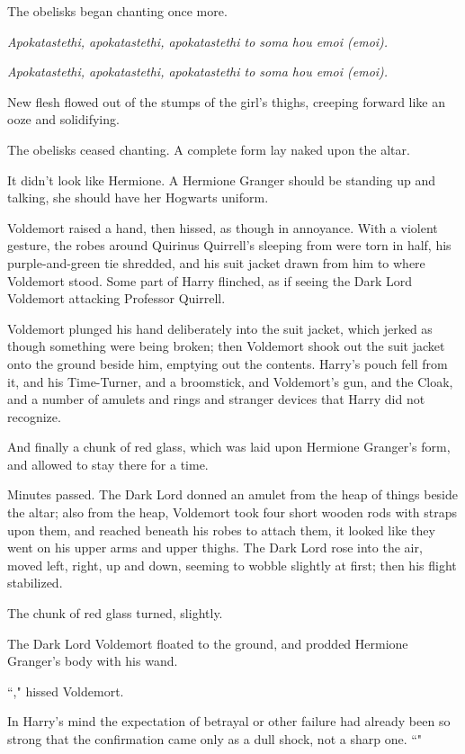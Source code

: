 The obelisks began chanting once more.

\emph{Apokatastethi, apokatastethi, apokatastethi to soma hou emoi (emoi).}

\emph{Apokatastethi, apokatastethi, apokatastethi to soma hou emoi (emoi).}

New flesh flowed out of the stumps of the girl's thighs, creeping forward like an ooze and solidifying.

The obelisks ceased chanting. A complete form lay naked upon the altar.

It didn't look like Hermione. A Hermione Granger should be standing up and talking, she should have her Hogwarts uniform.

Voldemort raised a hand, then hissed, as though in annoyance. With a violent gesture, the robes around Quirinus Quirrell's sleeping from were torn in half, his purple-and-green tie shredded, and his suit jacket drawn from him to where Voldemort stood. Some part of Harry flinched, as if seeing the Dark Lord Voldemort attacking Professor Quirrell.

Voldemort plunged his hand deliberately into the suit jacket, which jerked as though something were being broken; then Voldemort shook out the suit jacket onto the ground beside him, emptying out the contents. Harry's pouch fell from it, and his Time-Turner, and a broomstick, and Voldemort's gun, and the Cloak, and a number of amulets and rings and stranger devices that Harry did not recognize.

And finally a chunk of red glass, which was laid upon Hermione Granger's form, and allowed to stay there for a time.

Minutes passed. The Dark Lord donned an amulet from the heap of things beside the altar; also from the heap, Voldemort took four short wooden rods with straps upon them, and reached beneath his robes to attach them, it looked like they went on his upper arms and upper thighs. The Dark Lord rose into the air, moved left, right, up and down, seeming to wobble slightly at first; then his flight stabilized.

The chunk of red glass turned, slightly.

The Dark Lord Voldemort floated to the ground, and prodded Hermione Granger's body with his wand.

``," hissed Voldemort.

In Harry's mind the expectation of betrayal or other failure had already been so strong that the confirmation came only as a dull shock, not a sharp one. ``"

